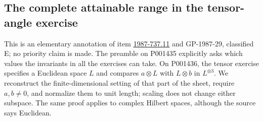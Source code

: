 \subsection{The complete attainable range in the tensor-angle exercise}
\label{dev:tensor-angles}

This is an elementary annotation of item
\hyperref[item:1987-737.11]{1987-737.11} and GP-1987-29, classified E;
no priority claim is made. The preamble on P001435 explicitly asks
which values the invariants in all the exercises can take. On P001436,
the tensor exercise specifies a Euclidean space \(L\) and compares
\(a\otimes L\) with \(L\otimes b\) in \(L^{\otimes3}\).
We reconstruct the finite-dimensional setting of that part of the
sheet, require \(a,b\ne0\), and normalize them to unit length;
scaling does not change either subspace. The same proof applies to
complex Hilbert spaces, although the source says Euclidean.

